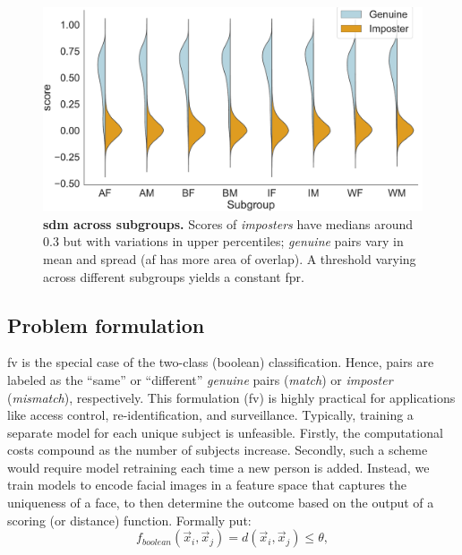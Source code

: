 \begin{figure}[t!] 
	\centering
	\centering
	\includegraphics[width=1\linewidth]{figures/violinplots.pdf}
		\caption{\small{\textbf{\Gls{sdm} across subgroups.} Scores of \emph{imposters} have medians around 0.3 but with variations in upper percentiles; \emph{genuine} pairs vary in mean and spread (\eg \gls{af} has more area of overlap). A threshold varying across different subgroups yields a constant \gls{fpr}.}} \label{fig:detection-model} 
	    \vspace{-4mm}
\end{figure} 

\subsection{Problem formulation}\label{subsec:pf} 
\Gls{fv} is the special case of the two-class (\ie boolean) classification. Hence, pairs are labeled as the ``same'' or ``different'' \textit{genuine} pairs (\ie \textit{match}) or \textit{imposter} (\ie \textit{mismatch}), respectively. This formulation (\ie \gls{fv}) is highly practical for applications like access control, re-identification, and surveillance. Typically, training a separate model for each unique subject is unfeasible. Firstly, the computational costs compound as the number of subjects increase.  Secondly, such a scheme would require model retraining each time a new person is added. Instead, we train models to encode facial images in a feature space that captures the uniqueness of a face, to then determine the outcome based on the output of a scoring (or distance) function. Formally put:
\begin{equation}\label{eg:matcher}
    f_{boolean}(\vec{x}_i, \vec{x}_j) = d(\vec{x}_i, \vec{x}_j) \leq \theta,
\end{equation}

